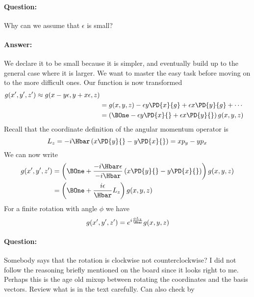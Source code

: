 \paragraph{Question:} Why can we assume that \(\epsilon\) is small?
%
\paragraph{Answer:} We declare it to be small because it is simpler, and eventually build up to the general case where it is larger.  We want to master the easy task before moving on to the more difficult ones.
%
Our function is now transformed
\begin{equation}\label{eqn:lecture12rotationsAndAngularMomentum:280}
\begin{aligned}
g(x', y', z') \approx g( x - y \epsilon, y + x \epsilon, z) \\
&=
g( x , y , z) - \epsilon y \PD{x}{g} + \epsilon x \PD{y}{g} + \cdots \\
&=
\left( \BOne
- \epsilon y \PD{x}{}
+ \epsilon x \PD{y}{}
\right)
g( x, y ,z )
\end{aligned}
\end{equation}
%
Recall that the coordinate definition of the angular momentum operator is
\begin{equation}\label{eqn:PHY356FDec7:120}
L_z = -i \Hbar \left( x \PD{y}{} - y \PD{x}{} \right) = x p_y - y p_x
\end{equation}
%
We can now write
\begin{equation}\label{eqn:lecture12rotationsAndAngularMomentum:300}
\begin{aligned}
g(x', y', z')
&=
\left( \BOne
+
\frac{-i \Hbar \epsilon}{-i\Hbar} \left(
x \PD{y}{}
- y \PD{x}{}
\right)
\right)
g( x, y ,z ) \\
&=
\left( \BOne +
\frac{i \epsilon}{\Hbar} L_z
\right)
g( x, y ,z )
\end{aligned}
\end{equation}
%
For a finite rotation with angle \(\phi\) we have
%
\begin{equation}\label{eqn:PHY356FDec7:130}
g(x', y', z')
=
e^{i \frac{\phi L_z}{\Hbar}}
g( x, y ,z )
\end{equation}
%
\paragraph{Question:} Somebody says that the rotation is clockwise not counterclockwise?
%
I did not follow the reasoning briefly mentioned on the board since it looks right to me.  Perhaps this is the age old mixup between rotating the coordinates and the basis vectors.  Review what is in the text carefully.  Can also check by

